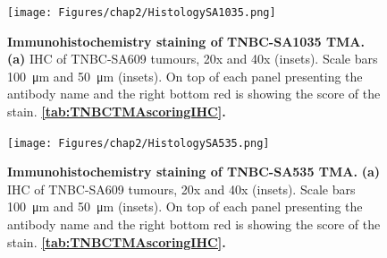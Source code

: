  \begin{figure}
\centering
\texttt{[image: Figures/chap2/HistologySA1035.png]}
	
\caption[]
	{\small
\textbf{Immunohistochemistry staining of TNBC-SA1035 TMA.}
 \textbf{(a)} IHC of TNBC-SA609 tumours, 20x and 40x (insets). Scale bars \SI{100}{\micro\metre} and \SI{50}{\micro\metre} (insets). On top of each panel presenting the antibody name and the right bottom red is showing the score of the stain. \textbf{\autoref{tab:TNBCTMAscoringIHC}.}}
	\label{fig:HistologySA1035}
\end{figure}

 \begin{figure}
\centering
\texttt{[image: Figures/chap2/HistologySA535.png]}
	
\caption[]
	{\small
\textbf{Immunohistochemistry staining of TNBC-SA535 TMA.}
 \textbf{(a)} IHC of TNBC-SA609 tumours, 20x and 40x (insets). Scale bars \SI{100}{\micro\metre} and \SI{50}{\micro\metre} (insets). On top of each panel presenting the antibody name and the right bottom red is showing the score of the stain. \textbf{\autoref{tab:TNBCTMAscoringIHC}.}}
	\label{fig:HistologySA535}
\end{figure}


